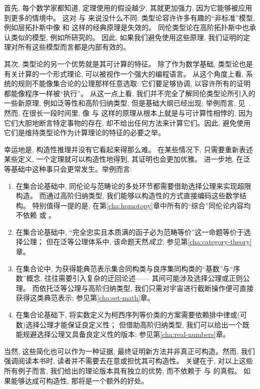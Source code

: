 首先, 每个数学家都知道, 定理使用的假设越少, 其就更加强力, 因为它能够被应用到更多的情境中。
这对 \choice{} 与 \LEM{} 来说没什么不同:
类型论容许许多有趣的``非标准''模型, 例如层拓扑斯中像 \choice{} 和 \LEM{} 这样的经典原理是失效的。
同伦类型论在高阶拓扑斯中也承认类似的模型, 例如\cite{ToenVezzosi02,Rezk05,lurie:higher-topoi}所研究的。
因此, 如果我们避免使用这些原理, 我们证明的定理对所有这些模型而言都是内部有效的。

其次, 类型论的另一个优势就是其可计算的特征。
除了作为数学基础, 类型论也是有关计算的一个形式理论, 可以被视作一个强大的编程语言。
%
从这个角度上看, 系统的规则不能像集合论的公理那样任意选取: 它们要足够协调, 以容许所有的证明都能像程序一样被``执行''。
从这一点上看, 我们并不完全了解同伦类型论所引入的一些新原理, 例如泛等性和高阶归纳类型, 但是基础大纲已经出现; 举例而言, 见~\cite{lh:canonicity}.
然而, 在很长一段时间里, 像 \choice{} 与 \LEM{} 这样的原理从根本上就是与可计算性相悖的,
因为它们大胆地断言特定事物的存在, 却不给出任何方法来计算它们。因此, 避免使用它们是维持类型论作为计算理论的特征的必要之举。

幸运地是, 构造性推理并没有它看起来得那么难。
在某些情况下, 只需要重新表述某些定义, 一个定理就可以构造性地得到, 其证明也会更加优雅。 
进一步地, 在泛等基础中这种事只会更常发生。举例而言: 

\begin{enumerate}
\item 在集合论基础中, 同伦论与范畴论的多处环节都需要借助选择公理来实现超限构造。
  而通过高阶归纳类型, 我们能够以构造性的方式直接编码这些数学结构。
  特别值得一提的是, 在第\ref{cha:homotopy}章中所有的``综合''同伦论内容均不依赖 \LEM{} 或 \choice{}。
\item 在集合论基础中, ``完全忠实且本质满的函子必为范畴等价''这一命题等价于选择公理；
  但在泛等公理体系中, 该命题天然\emph{成立}; 参见第\ref{cha:category-theory}章。
\item 在集合论中, 为获得能典范表示集合同构类与良序集同构类的``基数''与``序数''概念, 往往需要引入复杂的迂回论述——
  其间可能涉及选择公理或正则公理。
  而依托泛等公理与高阶归纳类型, 我们只需对宇宙进行截断操作便可直接获得这类典范表示; 参见第\ref{cha:set-math}章。
\item 在集合论基础下, 将实数定义为柯西序列等价类的方案需要依赖排中律或(可数)选择公理才能保证良定义性；
  但借助高阶归纳类型, 我们可以给出一个既能规避选择公理又具备良定义性的版本; 参见第\ref{cha:real-numbers}章。
\end{enumerate}

当然, 这些简化也可以作为一种证据, 最终证明新方法并非真正可构造。然而, 我们强调阅读本书时, 读者并不需要去在意或担忧其可构造性。
关键在于, 对以上这些所有例子而言, 我们给出的理论版本具有独立的优势, 而不依赖于 \LEM{} 与 \choice{} 的真假。
如果能够达成可构造性, 那将是一个额外的好处。%

